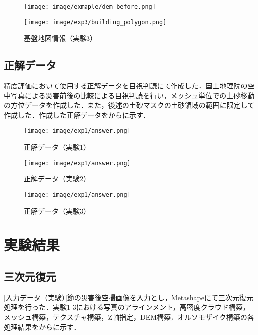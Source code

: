       \begin{figure}[tbp]
        \begin{minipage}[c]{0.5\hsize}
          \centering
          \texttt{[image: image/exmaple/dem\_before.png]}
        \end{minipage}
        \begin{minipage}[c]{0.5\hsize}
          \centering
          \texttt{[image: image/exp3/building\_polygon.png]}
        \end{minipage}
        \caption{基盤地図情報（実験3）}
        \label{基盤地図情報（実験3）}
      \end{figure}


    \subsection*{正解データ}
      精度評価において使用する正解データを目視判読にて作成した．国土地理院の空中写真による災害前後の比較\cite{国土地理院空撮画像1, 国土地理院空撮画像2}による目視判読を行い，メッシュ単位での土砂移動の方位データを作成した．また，後述の土砂マスクの土砂領域の範囲に限定して作成した．作成した正解データをからに示す．

      \begin{figure}[tbp]
        \centering
        \texttt{[image: image/exp1/answer.png]}
        \caption{正解データ（実験1）}
        \label{正解データ（実験1）}
      \end{figure}

      \begin{figure}[tbp]
        \centering
        \texttt{[image: image/exp1/answer.png]}
        \caption{正解データ（実験2）}
      \end{figure}

      \begin{figure}[tbp]
        \centering
        \texttt{[image: image/exp1/answer.png]}
        \caption{正解データ（実験3）}
        \label{正解データ（実験3）}
      \end{figure}


  \section{実験結果}
    \label{実験結果}
    \subsection*{三次元復元}
      \ref{入力データ（実験）}節の災害後空撮画像を入力とし，Metashapeにて三次元復元処理を行った．実験1-3における写真のアラインメント，高密度クラウド構築，メッシュ構築，テクスチャ構築，Z軸指定，DEM構築，オルソモザイク構築の各処理結果をからに示す．

